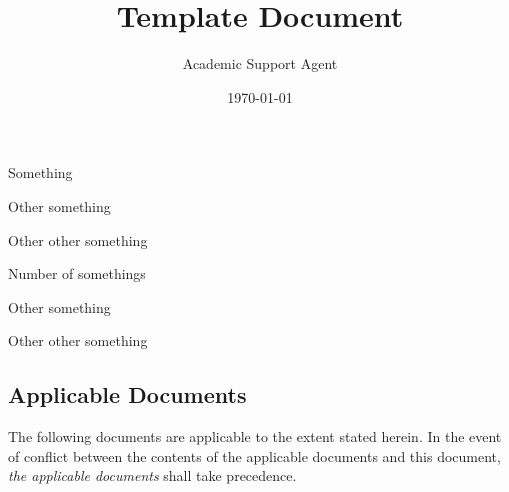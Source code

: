 \documentclass{article}
\title{Template Document}
\author{Academic Support Agent}
\date{\today}
\begin{document}
\maketitle

\aeneasfrontpage

\aeneastableofcontents

\aeneaslistofabbreviations
\begin{basedescript}{\desclabelstyle{\pushlabel}\desclabelwidth{6em}}
    \item[SOMETHING] Something \vspace{-0.2cm}
    \item[OTHER] Other something \vspace{-0.2cm}
    \item[OTHER] Other other something \vspace{-0.2cm}
\end{basedescript} 

\aeneaslistofsymbols
\begin{basedescript}{\desclabelstyle{\pushlabel}\desclabelwidth{6em}}
    \item[$N_\mathrm{something}$] Number of somethings \vspace{-0.2cm}
    \item[OTHER] Other something \vspace{-0.2cm}
    \item[OTHER] Other other something \vspace{-0.2cm}
\end{basedescript} 


\aeneaslistoffigures

\aeneaslistoftables

\aeneassummary

\aeneasreferencedocs

\subsection*{Applicable Documents}

The following documents are applicable to the extent stated herein. In the
event of conflict between the contents of the applicable documents and this
document, \emph{the applicable documents} shall take precedence.
\end{document}
